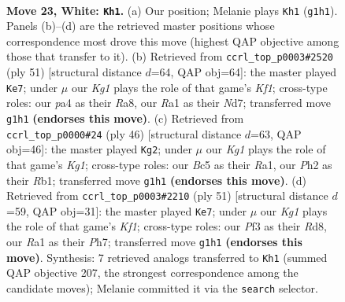 \documentclass[11pt]{article}
\begin{document}
\clearpage

\begin{figure}[p]\centering
\begin{subfigure}{0.46\textwidth}\centering
\resizebox{\linewidth}{!}{%
\newchessgame
\chessboard[
  setfen={r5kr/6b1/2n5/2Bp2p1/p2P3p/P4P2/3N2PP/R4RK1 w - - 1 23},
  showmover=false,
  pgfstyle=straightmove, color=movearrow, markmove={g1-h1}
]}
\caption{}
\end{subfigure}\hfill
\begin{subfigure}{0.46\textwidth}\centering
\resizebox{\linewidth}{!}{%
\newchessgame
\chessboard[
  setfen={r1r2k2/p2n1ppp/4p3/PP1b4/2p4P/4BP2/4B1P1/R1R3K1 b - - 0 26},
  showmover=false,
  pgfstyle=straightmove, color=movearrow, markmove={f8-e7}
]}
\caption{}
\end{subfigure}
\\[4pt]
\begin{subfigure}{0.46\textwidth}\centering
\resizebox{\linewidth}{!}{%
\newchessgame
\chessboard[
  setfen={r2b1k2/r2n1ppp/2p1p3/P7/3PpP2/1N4P1/5P1P/RR2B1K1 w - - 0 24},
  showmover=false,
  pgfstyle=straightmove, color=movearrow, markmove={g1-g2}
]}
\caption{}
\end{subfigure}\hfill
\begin{subfigure}{0.46\textwidth}\centering
\resizebox{\linewidth}{!}{%
\newchessgame
\chessboard[
  setfen={r2r1k2/1p3ppp/p1b1n3/8/1P2p3/P1N1P2P/2R1BPP1/5RK1 b - - 1 26},
  showmover=false,
  pgfstyle=straightmove, color=movearrow, markmove={f8-e7}
]}
\caption{}
\end{subfigure}
\caption{\textbf{Move 23, White: \texttt{Kh1}.} (a) Our position; Melanie plays \texttt{Kh1} (\texttt{g1h1}). Panels (b)--(d) are the retrieved master positions whose correspondence most drove this move (highest QAP objective among those that transfer to it). (b) Retrieved from \texttt{ccrl\_top\_p0003\#2520} (ply 51) [structural distance $d$=64, QAP obj=64]: the master played \texttt{Ke7}; under $\mu$ our \emph{Kg1} plays the role of that game's \emph{Kf1}; cross-type roles: our \emph{p}a4 as their \emph{R}a8, our \emph{R}a1 as their \emph{N}d7; transferred move \texttt{g1h1} \textbf{(endorses this move)}. (c) Retrieved from \texttt{ccrl\_top\_p0000\#24} (ply 46) [structural distance $d$=63, QAP obj=46]: the master played \texttt{Kg2}; under $\mu$ our \emph{Kg1} plays the role of that game's \emph{Kg1}; cross-type roles: our \emph{B}c5 as their \emph{R}a1, our \emph{P}h2 as their \emph{R}b1; transferred move \texttt{g1h1} \textbf{(endorses this move)}. (d) Retrieved from \texttt{ccrl\_top\_p0003\#2210} (ply 51) [structural distance $d$=59, QAP obj=31]: the master played \texttt{Ke7}; under $\mu$ our \emph{Kg1} plays the role of that game's \emph{Kf1}; cross-type roles: our \emph{P}f3 as their \emph{R}d8, our \emph{R}a1 as their \emph{P}h7; transferred move \texttt{g1h1} \textbf{(endorses this move)}. Synthesis: 7 retrieved analogs transferred to \texttt{Kh1} (summed QAP objective 207, the strongest correspondence among the candidate moves); Melanie committed it via the \texttt{search} selector.}
\label{fig:thought-m44}
\end{figure}
\end{document}
